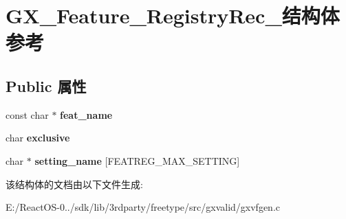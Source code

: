 \hypertarget{struct_g_x___feature___registry_rec__}{}\section{G\+X\+\_\+\+Feature\+\_\+\+Registry\+Rec\+\_\+结构体 参考}
\label{struct_g_x___feature___registry_rec__}
\subsection*{Public 属性}
\begin{DoxyCompactItemize}
\item 
\mbox{\label{struct_g_x___feature___registry_rec___a71b86a7c61d55416f5884b78d32d2929}} 
const char $\ast$ {\bfseries feat\+\_\+name}
\item 
\mbox{\label{struct_g_x___feature___registry_rec___ac03847857fa27d0e14d13a16e188c71a}} 
char {\bfseries exclusive}
\item 
\mbox{\label{struct_g_x___feature___registry_rec___ac880ad24c52c9a5e257bf750bc1fde2e}} 
char $\ast$ {\bfseries setting\+\_\+name} \mbox{[}F\+E\+A\+T\+R\+E\+G\+\_\+\+M\+A\+X\+\_\+\+S\+E\+T\+T\+I\+NG\mbox{]}
\end{DoxyCompactItemize}


该结构体的文档由以下文件生成\+:\begin{DoxyCompactItemize}
\item 
E\+:/\+React\+O\+S-\/0../sdk/lib/3rdparty/freetype/src/gxvalid/gxvfgen.\+c\end{DoxyCompactItemize}
